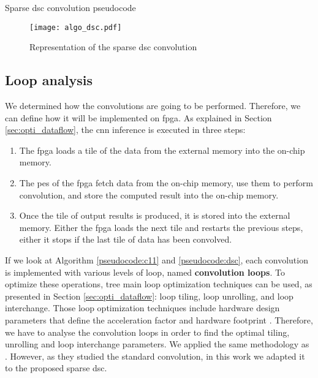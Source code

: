 \begin{enumerate}
\begin{algorithm}[H]
\begin{algorithmic}
                        \EndFor
                    \EndFor
                \EndFor
            \EndFor
        \end{algorithmic}
        \caption{Sparse \acrshort{dsc} convolution pseudocode}
        \label{pseudocode:dsc}
    \end{algorithm}
    \begin{figure}[H]
        \centering
        \texttt{[image: algo\_dsc.pdf]}
        \caption{Representation of the sparse \acrshort{dsc} convolution}
        \label{fig:algo_dsc}
    \end{figure}
\end{enumerate}
%
\subsection{Loop analysis}
%
We determined how the convolutions are going to be performed. Therefore, we can define how it will be implemented on \acrshort{fpga}. As explained in Section \ref{sec:opti_dataflow}, the \acrshort{cnn} inference is executed in three steps:
%
\begin{enumerate}
    \item The \acrshort{fpga} loads a tile of the data from the external memory into the on-chip memory.
    \item The \acrshort{pe}s of the \acrshort{fpga} fetch data from the on-chip memory, use them to perform convolution, and store the computed result into the on-chip memory.
    \item Once the tile of output results is produced, it is stored into the external memory. Either the \acrshort{fpga} loads the next tile and restarts the previous steps, either it stops if the last tile of data has been convolved.
\end{enumerate}
%
If we look at Algorithm \ref{pseudocode:c11} and \ref{pseudocode:dsc}, each convolution is implemented with various levels of loop, named \textbf{convolution loops}. To optimize these operations, tree main loop optimization techniques can be used, as presented in Section \ref{sec:opti_dataflow}: loop tiling, loop unrolling, and loop interchange. Those loop optimization techniques include hardware design parameters that define the acceleration factor and hardware footprint \cite{ma_optimizing_2018}. Therefore, we have to analyse the convolution loops in order to find the optimal tiling, unrolling and loop interchange parameters. We applied the same methodology as \textcite{ma_optimizing_2018}. However, as they studied the standard convolution, in this work we adapted it to the proposed sparse \acrshort{dsc}.\cite{ma_optimizing_2018}

